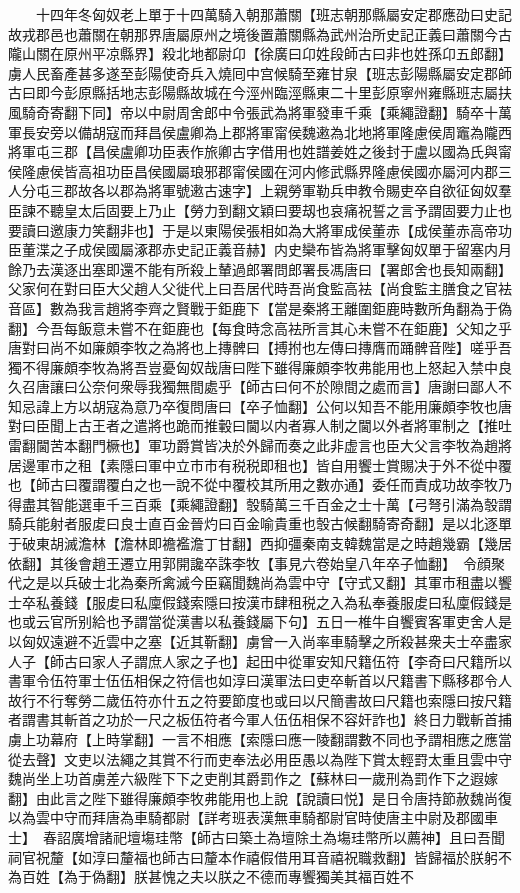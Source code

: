 　　十四年冬匈奴老上單于十四萬騎入朝那蕭關【班志朝那縣屬安定郡應劭曰史記故戎郡邑也蕭關在朝那界唐屬原州之境後置蕭關縣為武州治所史記正義曰蕭關今古隴山關在原州平凉縣界】殺北地都尉卬【徐廣曰卬姓段師古曰非也姓孫卬五郎翻】虜人民畜產甚多遂至彭陽使奇兵入燒囘中宫候騎至雍甘泉【班志彭陽縣屬安定郡師古曰即今彭原縣括地志彭陽縣故城在今涇州臨涇縣東二十里彭原寧州雍縣班志屬扶風騎奇寄翻下同】帝以中尉周舍郎中令張武為將軍發車千乘【乘繩證翻】騎卒十萬軍長安旁以備胡寇而拜昌侯盧卿為上郡將軍甯侯魏遫為北地將軍隆慮侯周竈為隴西將軍屯三郡【昌侯盧卿功臣表作旅卿古字借用也姓譜姜姓之後封于盧以國為氏與甯侯隆慮侯皆高祖功臣昌侯國屬琅邪郡甯侯國在河内修武縣界隆慮侯國亦屬河内郡三人分屯三郡故各以郡為將軍號遫古速字】上親勞軍勒兵申教令賜吏卒自欲征匈奴羣臣諫不聽皇太后固要上乃止【勞力到翻文穎曰要刼也哀痛祝誓之言予謂固要力止也要讀曰邀康力笑翻非也】于是以東陽侯張相如為大將軍成侯董赤【成侯董赤高帝功臣董渫之子成侯國屬涿郡赤史記正義音赫】内史欒布皆為將軍擊匈奴單于留塞内月餘乃去漢逐出塞即還不能有所殺上輦過郎署問郎署長馮唐曰【署郎舍也長知兩翻】父家何在對曰臣大父趙人父徙代上曰吾居代時吾尚食監高袪【尚食監主膳食之官袪音區】數為我言趙將李齊之賢戰于鉅鹿下【當是秦將王離圍鉅鹿時數所角翻為于偽翻】今吾每飯意未嘗不在鉅鹿也【每食時念高袪所言其心未嘗不在鉅鹿】父知之乎唐對曰尚不如廉頗李牧之為將也上摶髀曰【搏拊也左傳曰摶膺而踊髀音陛】嗟乎吾獨不得廉頗李牧為將吾豈憂匈奴哉唐曰陛下雖得廉頗李牧弗能用也上怒起入禁中良久召唐讓曰公奈何衆辱我獨無間處乎【師古曰何不於隙間之處而言】唐謝曰鄙人不知忌諱上方以胡寇為意乃卒復問唐曰【卒子恤翻】公何以知吾不能用廉頗李牧也唐對曰臣聞上古王者之遣將也跪而推轂曰閫以内者寡人制之閫以外者將軍制之【推吐雷翻閫苦本翻門橛也】軍功爵賞皆决於外歸而奏之此非虚言也臣大父言李牧為趙將居邊軍市之租【素隱曰軍中立市市有税税即租也】皆自用饗士賞賜决于外不從中覆也【師古曰覆謂覆白之也一說不從中覆校其所用之數亦通】委任而責成功故李牧乃得盡其智能選車千三百乘【乘繩證翻】彀騎萬三千百金之士十萬【弓弩引滿為彀謂騎兵能射者服䖍曰良士直百金晉灼曰百金喻貴重也彀古候翻騎寄奇翻】是以北逐單于破東胡滅澹林【澹林即襜襤澹丁甘翻】西抑彊秦南支韓魏當是之時趙幾霸【幾居依翻】其後會趙王遷立用郭開讒卒誅李牧【事見六卷始皇八年卒子恤翻】　令顔聚代之是以兵破士北為秦所禽滅今臣竊聞魏尚為雲中守【守式又翻】其軍市租盡以饗士卒私養錢【服䖍曰私廩假錢索隱曰按漢市肆租税之入為私奉養服䖍曰私廩假錢是也或云官所别給也予謂當從漢書以私養錢屬下句】五日一椎牛自饗賓客軍吏舍人是以匈奴遠避不近雲中之塞【近其靳翻】虜曾一入尚率車騎擊之所殺甚衆夫士卒盡家人子【師古曰家人子謂庶人家之子也】起田中從軍安知尺籍伍符【李奇曰尺籍所以書軍令伍符軍士伍伍相保之符信也如淳曰漢軍法曰吏卒斬首以尺籍書下縣移郡令人故行不行奪勞二歲伍符亦什五之符要節度也或曰以尺簡書故曰尺籍也索隱曰按尺籍者謂書其斬首之功於一尺之板伍符者今軍人伍伍相保不容奸詐也】終日力戰斬首捕虜上功幕府【上時掌翻】一言不相應【索隱曰應一陵翻謂數不同也予謂相應之應當從去聲】文吏以法繩之其賞不行而吏奉法必用臣愚以為陛下賞太輕罸太重且雲中守魏尚坐上功首虜差六級陛下下之吏削其爵罰作之【蘇林曰一歲刑為罰作下之遐嫁翻】由此言之陛下雖得廉頗李牧弗能用也上說【說讀曰悦】是日令唐持節赦魏尚復以為雲中守而拜唐為車騎都尉【詳考班表漢無車騎都尉官時使唐主中尉及郡國車士】　春詔廣增諸祀壇塲珪幣【師古曰築土為壇除土為塲珪幣所以薦神】且曰吾聞祠官祝釐【如淳曰釐福也師古曰釐本作禧假借用耳音禧祝職救翻】皆歸福於朕躬不為百姓【為于偽翻】朕甚愧之夫以朕之不德而專饗獨美其福百姓不